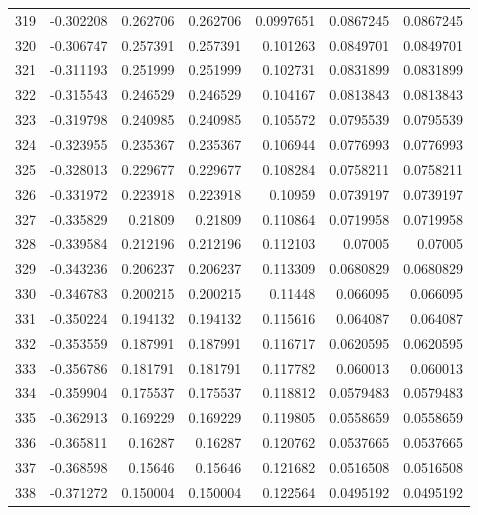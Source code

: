 \begin{tabular}{rrrrrrr}
 319 & -0.302208    & 0.262706    & 0.262706    &  0.0997651   & 0.0867245   & 0.0867245   \\
 320 & -0.306747    & 0.257391    & 0.257391    &  0.101263    & 0.0849701   & 0.0849701   \\
 321 & -0.311193    & 0.251999    & 0.251999    &  0.102731    & 0.0831899   & 0.0831899   \\
 322 & -0.315543    & 0.246529    & 0.246529    &  0.104167    & 0.0813843   & 0.0813843   \\
 323 & -0.319798    & 0.240985    & 0.240985    &  0.105572    & 0.0795539   & 0.0795539   \\
 324 & -0.323955    & 0.235367    & 0.235367    &  0.106944    & 0.0776993   & 0.0776993   \\
 325 & -0.328013    & 0.229677    & 0.229677    &  0.108284    & 0.0758211   & 0.0758211   \\
 326 & -0.331972    & 0.223918    & 0.223918    &  0.10959     & 0.0739197   & 0.0739197   \\
 327 & -0.335829    & 0.21809     & 0.21809     &  0.110864    & 0.0719958   & 0.0719958   \\
 328 & -0.339584    & 0.212196    & 0.212196    &  0.112103    & 0.07005     & 0.07005     \\
 329 & -0.343236    & 0.206237    & 0.206237    &  0.113309    & 0.0680829   & 0.0680829   \\
 330 & -0.346783    & 0.200215    & 0.200215    &  0.11448     & 0.066095    & 0.066095    \\
 331 & -0.350224    & 0.194132    & 0.194132    &  0.115616    & 0.064087    & 0.064087    \\
 332 & -0.353559    & 0.187991    & 0.187991    &  0.116717    & 0.0620595   & 0.0620595   \\
 333 & -0.356786    & 0.181791    & 0.181791    &  0.117782    & 0.060013    & 0.060013    \\
 334 & -0.359904    & 0.175537    & 0.175537    &  0.118812    & 0.0579483   & 0.0579483   \\
 335 & -0.362913    & 0.169229    & 0.169229    &  0.119805    & 0.0558659   & 0.0558659   \\
 336 & -0.365811    & 0.16287     & 0.16287     &  0.120762    & 0.0537665   & 0.0537665   \\
 337 & -0.368598    & 0.15646     & 0.15646     &  0.121682    & 0.0516508   & 0.0516508   \\
 338 & -0.371272    & 0.150004    & 0.150004    &  0.122564    & 0.0495192   & 0.0495192   \\

\end{tabular}
